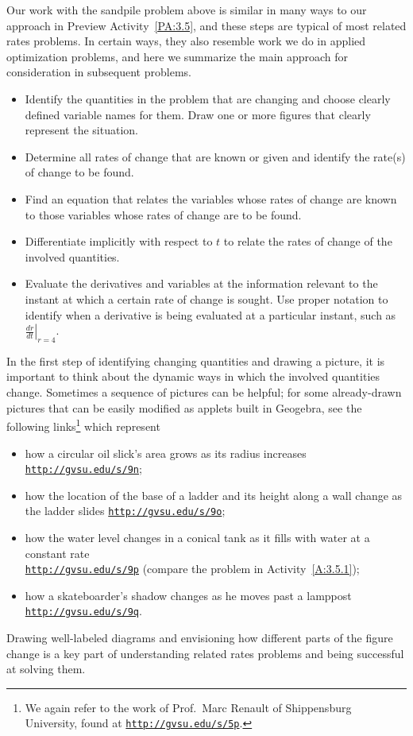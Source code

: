 Our work with the sandpile problem above is similar in many ways to our approach in Preview Activity~\ref{PA:3.5}, and these steps are typical of most related rates problems.  In certain ways, they also resemble work we do in applied optimization problems, and here we summarize the main approach for consideration in subsequent problems.
\begin{itemize}
	\item Identify the quantities in the problem that are changing and choose clearly defined variable names for them.  Draw one or more figures that clearly represent the situation.
	\item Determine all rates of change that are known or given and identify the rate(s) of change to be found.
	\item Find an equation that relates the variables whose rates of change are known to those variables whose rates of change are to be found.
	\item Differentiate implicitly with respect to $t$ to relate the rates of change of the involved quantities. 
	\item Evaluate the derivatives and variables at the information relevant to the instant at which a certain rate of change is sought.  Use proper notation to identify when a derivative is being evaluated at a particular instant, such as $\left. \frac{dr}{dt} \right|_{r=4}$.
\end{itemize}

In the first step of identifying changing quantities and drawing a picture, it is important to think about the dynamic ways in which the involved quantities change.  Sometimes a sequence of pictures can be helpful; for some already-drawn pictures that can be easily modified as applets built in Geogebra, see the following links\footnote{We again refer to the work of Prof.~Marc Renault of Shippensburg University, found at \href{http://gvsu.edu/s/5p}{\texttt{http://gvsu.edu/s/5p}}.} which represent 
\begin{itemize}
	\item how a circular oil slick's area grows as its radius increases \href{http://gvsu.edu/s/9n}{\texttt{http://gvsu.edu/s/9n}};
	\item how the location of the base of a ladder and its height along a wall change as the ladder slides \href{http://gvsu.edu/s/9o}{\texttt{http://gvsu.edu/s/9o}};
	\item how the water level changes in a conical tank as it fills with water at a constant rate \\
	\href{http://gvsu.edu/s/9p}{\texttt{http://gvsu.edu/s/9p}} (compare the problem in Activity~\ref{A:3.5.1});
	\item how a skateboarder's shadow changes as he moves past a lamppost \\
	 \href{http://gvsu.edu/s/9q}{\texttt{http://gvsu.edu/s/9q}}.
\end{itemize}
Drawing well-labeled diagrams and envisioning how different parts of the figure change is a key part of understanding related rates problems and being successful at solving them.

